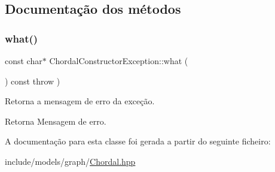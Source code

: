 \subsection{Documentação dos métodos}
\mbox{\label{classChordalConstructorException_af45168f68f01e0b7cd98d8e82306a49b}} 
\subsubsection{\texorpdfstring{what()}{what()}}
{\footnotesize\ttfamily const char$\ast$ Chordal\+Constructor\+Exception\+::what (\begin{DoxyParamCaption}{ }\end{DoxyParamCaption}) const throw  ) \hspace{0.3cm}{\ttfamily [inline]}}

Retorna a mensagem de erro da exceção. \begin{DoxyReturn}{Retorna}
Mensagem de erro. 
\end{DoxyReturn}


A documentação para esta classe foi gerada a partir do seguinte ficheiro\+:\begin{DoxyCompactItemize}
\item 
include/models/graph/\hyperlink{Chordal_8hpp}{Chordal.\+hpp}\end{DoxyCompactItemize}
